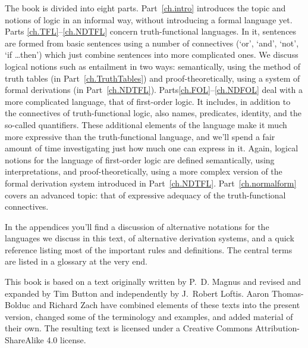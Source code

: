 The book is divided into eight parts. Part~\ref{ch.intro} introduces the topic and notions of logic in an informal way, without introducing a formal language yet.  Parts \ref{ch.TFL}--\ref{ch.NDTFL} concern truth-functional languages. In it, sentences are formed from basic sentences using a number of connectives (`or', `and', `not', `if \dots then') which just combine sentences into more complicated ones.  We discuss logical notions such as entailment in two ways: semantically, using the method of truth tables (in Part~\ref{ch.TruthTables}) and proof-theoretically, using a system of formal derivations (in Part~\ref{ch.NDTFL}).  Parts\ref{ch.FOL}--\ref{ch.NDFOL} deal with a more complicated language, that of first-order logic. It includes, in addition to the connectives of truth-functional logic, also names, predicates, identity, and the so-called quantifiers. These additional elements of the language make it much more expressive than the truth-functional language, and we'll spend a fair amount of time investigating just how much one can express in it.  Again, logical notions for the language of first-order logic are defined semantically, using interpretations, and proof-theoretically, using a more complex version of the formal derivation system introduced in Part~\ref{ch.NDTFL}.  Part~\ref{ch.normalform} covers an advanced topic: that of expressive adequacy of the truth-functional connectives.

In the appendices you'll find a discussion of alternative notations for the languages we discuss in this text, of alternative derivation systems, and a quick reference listing most of the important rules and definitions. The central terms are listed in a glossary at the very end.

This book is based on a text originally written by P.~D. Magnus and revised and expanded by Tim Button and independently by J.~Robert Loftis.  Aaron Thomas-Bolduc and Richard Zach have combined elements of these texts into the present version, changed some of the terminology and examples, and added material of their own.  The resulting text is licensed under a Creative Commons Attribution-ShareAlike 4.0 license.

